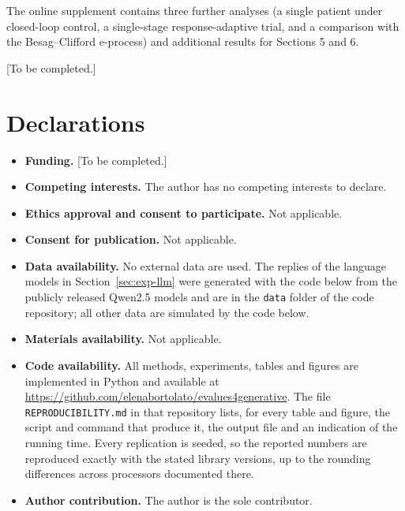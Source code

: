 
\backmatter

The online supplement contains three further analyses (a single patient under
closed-loop control, a single-stage response-adaptive trial, and a comparison
with the Besag--Clifford e-process) and additional results for Sections 5
and 6.

[To be completed.]

\section*{Declarations}

\begin{itemize}
\item \textbf{Funding.} [To be completed.]
\item \textbf{Competing interests.} The author has no competing interests to
declare.
\item \textbf{Ethics approval and consent to participate.} Not applicable.
\item \textbf{Consent for publication.} Not applicable.
\item \textbf{Data availability.} No external data are used. The replies of the language models in
Section~\ref{sec:exp-llm} were generated with the code below from the publicly
released Qwen2.5 models and are in the \texttt{data} folder of the code
repository; all other data are simulated by the code below.
\item \textbf{Materials availability.} Not applicable.
\item \textbf{Code availability.} All methods, experiments, tables and figures are implemented in Python and
available at \url{https://github.com/elenabortolato/evalues4generative}. The
file \texttt{REPRODUCIBILITY.md} in that repository lists, for every table
and figure, the script and command that produce it, the output file and an
indication of the running time. Every replication is seeded, so the reported
numbers are reproduced exactly with the stated library versions, up to the
rounding differences across processors documented there.
\item \textbf{Author contribution.} The author is the sole contributor.
\end{itemize}



